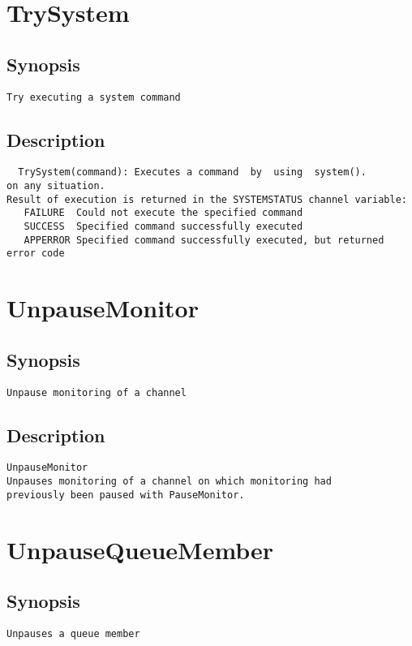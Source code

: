 \section{TrySystem}
\subsection{Synopsis}
\begin{verbatim}
Try executing a system command
\end{verbatim}
\subsection{Description}
\begin{verbatim}
  TrySystem(command): Executes a command  by  using  system().
on any situation.
Result of execution is returned in the SYSTEMSTATUS channel variable:
   FAILURE	Could not execute the specified command
   SUCCESS	Specified command successfully executed
   APPERROR	Specified command successfully executed, but returned error code

\end{verbatim}


\section{UnpauseMonitor}
\subsection{Synopsis}
\begin{verbatim}
Unpause monitoring of a channel
\end{verbatim}
\subsection{Description}
\begin{verbatim}
UnpauseMonitor
Unpauses monitoring of a channel on which monitoring had
previously been paused with PauseMonitor.

\end{verbatim}


\section{UnpauseQueueMember}
\subsection{Synopsis}
\begin{verbatim}
Unpauses a queue member
\end{verbatim}
